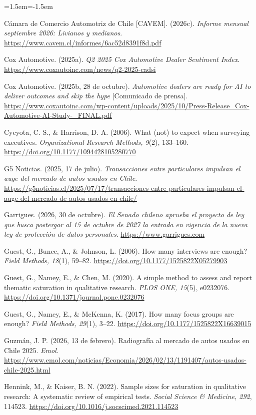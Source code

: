 \documentclass[11pt,a4paper]{article}
\begin{document}
\begin{list}{}{\leftmargin=1.5em\itemindent=-1.5em\itemsep=3pt}
\item Cámara de Comercio Automotriz de Chile [CAVEM]. (2026c). \emph{Informe mensual septiembre 2026: Livianos y medianos}. \url{https://www.cavem.cl/informes/6ac52d8391f8d.pdf}
\item Cox Automotive. (2025a). \emph{Q2 2025 Cox Automotive Dealer Sentiment Index}. \url{https://www.coxautoinc.com/news/q2-2025-cadsi}
\item Cox Automotive. (2025b, 28 de octubre). \emph{Automotive dealers are ready for AI to deliver outcomes and skip the hype} [Comunicado de prensa]. \url{https://www.coxautoinc.com/wp-content/uploads/2025/10/Press-Release_Cox-Automotive-AI-Study-_FINAL.pdf}
\item Cycyota, C. S., \& Harrison, D. A. (2006). What (not) to expect when surveying executives. \emph{Organizational Research Methods, 9}(2), 133–160. \url{https://doi.org/10.1177/1094428105280770}
\item G5 Noticias. (2025, 17 de julio). \emph{Transacciones entre particulares impulsan el auge del mercado de autos usados en Chile}. \url{https://g5noticias.cl/2025/07/17/transacciones-entre-particulares-impulsan-el-auge-del-mercado-de-autos-usados-en-chile/}
\item Garrigues. (2026, 30 de octubre). \emph{El Senado chileno aprueba el proyecto de ley que busca postergar al 15 de octubre de 2027 la entrada en vigencia de la nueva ley de protección de datos personales}. \url{https://www.garrigues.com}
\item Guest, G., Bunce, A., \& Johnson, L. (2006). How many interviews are enough? \emph{Field Methods, 18}(1), 59–82. \url{https://doi.org/10.1177/1525822X05279903}
\item Guest, G., Namey, E., \& Chen, M. (2020). A simple method to assess and report thematic saturation in qualitative research. \emph{PLOS ONE, 15}(5), e0232076. \url{https://doi.org/10.1371/journal.pone.0232076}
\item Guest, G., Namey, E., \& McKenna, K. (2017). How many focus groups are enough? \emph{Field Methods, 29}(1), 3–22. \url{https://doi.org/10.1177/1525822X16639015}
\item Guzmán, J. P. (2026, 13 de febrero). Radiografía al mercado de autos usados en Chile 2025. \emph{Emol}. \url{https://www.emol.com/noticias/Economia/2026/02/13/1191407/autos-usados-chile-2025.html}
\item Hennink, M., \& Kaiser, B. N. (2022). Sample sizes for saturation in qualitative research: A systematic review of empirical tests. \emph{Social Science \& Medicine, 292}, 114523. \url{https://doi.org/10.1016/j.socscimed.2021.114523}

\end{list}
\end{document}
